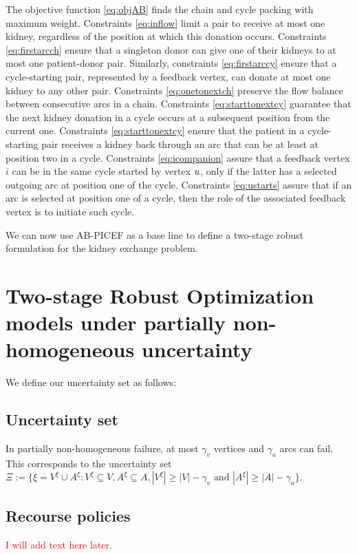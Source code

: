 \documentclass{article}
\begin{document}
The objective function \eqref{eq:objAB} finds the chain and cycle packing with maximum weight. Constraints \eqref{eq:inflow} limit a pair to receive at most one kidney, regardless of the position at which this donation occurs. Constraints \eqref{eq:firstarcch} ensure that a singleton donor can give one of their kidneys to at most one patient-donor pair. Similarly, constraints \eqref{eq:firstarccy} ensure that a cycle-starting pair, represented by a feedback vertex, can donate at most one kidney to any other pair. Constraints \eqref{eq:onetonextch} preserve the flow balance between consecutive arcs in a chain. Constraints \eqref{eq:starttonextcy} guarantee that the next kidney donation in a cycle occurs at a subsequent position from the current one. Constraints \eqref{eq:starttonextcy} ensure that the patient in a cycle-starting pair receives a kidney back through an arc that can be at least at position two in a cycle. Constraints \eqref{eq:icompanion} assure that  a feedback vertex $i$ can be in the same cycle started by vertex $u$, only if the latter has a selected outgoing arc at position one of the cycle. Constraints 	\eqref{eq:ustarts} assure that if an arc is selected at position one of a cycle, then the role of the associated feedback vertex is to initiate such cycle.

We can now use AB-PICEF as a base line to define a two-stage robust formulation for the kidney exchange problem. 

\section{Two-stage Robust Optimization models under partially non-homogeneous uncertainty}
We define our uncertainty set as follows:

\subsection{Uncertainty set}
\begin{definition}
	In partially non-homogeneous failure, at most $\gamma_v$ vertices and $\gamma_a$ arcs can fail. This corresponds to the uncertainty set $\Xi := \{\xi = V^{\xi} \cup A^{\xi}:  V^{\xi} \subseteq V,  A^{\xi} \subseteq A, |V^{\xi}| \ge |V| - \gamma_v \text{ and } |A^{\xi}| \ge  |A| - \gamma_a\}$.
\end{definition}

\subsection{Recourse policies}
\textcolor{red}{I will add text here later.}
\end{document}
